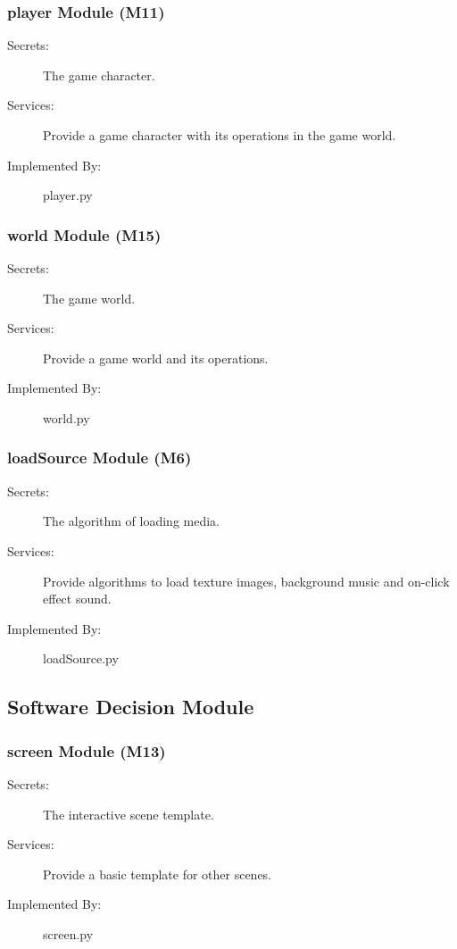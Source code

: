 \documentclass[12pt, titlepage]{article}
\begin{document}
\subsubsection{player Module (M11)}
\begin{description}
\item[Secrets:]The game character.
\item[Services:]Provide a game character with its operations in the game world.
\item[Implemented By:] player.py
\end{description}

\subsubsection{world Module (M15)}
\begin{description}
\item[Secrets:]The game world.
\item[Services:]Provide a game world and its operations.
\item[Implemented By:] world.py
\end{description}

\subsubsection{loadSource Module (M6)}
\begin{description}
\item[Secrets:]The algorithm of loading media.
\item[Services:]Provide algorithms to load texture images, background music and on-click effect sound.
\item[Implemented By:] loadSource.py
\end{description}
\subsection{Software Decision Module}

\subsubsection{screen Module (M13)}
\begin{description}
\item[Secrets:]The interactive scene template.
\item[Services:]Provide a basic template for other scenes.
\item[Implemented By:] screen.py
\end{description}
\end{document}
